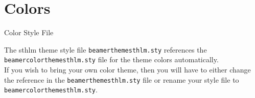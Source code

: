 \documentclass[newPxFont,numfooter,sectionpages]{beamer}
\begin{document}
%
%
\section{Colors}


\begin{frame}[c]{Color Style File}
	
The sthlm theme style file \texttt{beamerthemesthlm.sty} references the \texttt{beamercolorthemesthlm.sty} file for the theme colors automatically. \\
\vspace{1em}
If you wish to bring your own color theme, then you will have to either change the reference in the \texttt{beamerthemesthlm.sty} file or rename your style file to \texttt{beamercolorthemesthlm.sty}.

\end{frame}

\end{document}
